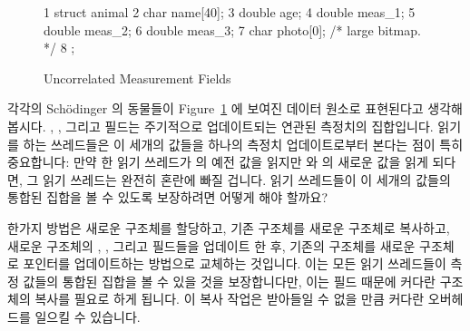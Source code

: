 \begin{figure}[tbp]
{ \scriptsize
\begin{verbbox}
 1 struct animal {
 2   char name[40];
 3   double age;
 4   double meas_1;
 5   double meas_2;
 6   double meas_3;
 7   char photo[0]; /* large bitmap. */
 8 };
\end{verbbox}
}
\centering
\theverbbox
\caption{Uncorrelated Measurement Fields}
\label{fig:together:Uncorrelated Measurement Fields}
\end{figure}

각각의 Sch\"odinger 의 동물들이
Figure~\ref{fig:together:Uncorrelated Measurement Fields}
에 보여진 데이터 원소로 표현된다고 생각해 봅시다.
, , 그리고  필드는 주기적으로 업데이트되는
연관된 측정치의 집합입니다.
읽기를 하는 쓰레드들은 이 세개의 값들을 하나의 측정치 업데이트로부터 본다는
점이 특히 중요합니다: 만약 한 읽기 쓰레드가  의 예전 값을 읽지만
 와  의 새로운 값을 읽게 되다면, 그 읽기 쓰레드는 완전히
혼란에 빠질 겁니다.
읽기 쓰레드들이 이 세개의 값들의 통합된 집합을 볼 수 있도록 보장하려면 어떻게
해야 할까요?
\iffalse

Suppose that each of Sch\"odinger's animals is represented by the
data element shown in
Figure~\ref{fig:together:Uncorrelated Measurement Fields}.
The \co{meas_1}, \co{meas_2}, and \co{meas_3} fields are a set
of correlated measurements that are updated periodically.
It is critically important that readers see these three values from
a single measurement update: If a reader sees an old value of
\co{meas_1} but new values of \co{meas_2} and \co{meas_3}, that
reader will become fatally confused.
How can we guarantee that readers will see coordinated sets of these
three values?
\fi

한가지 방법은 새로운  구조체를 할당하고, 기존 구조체를 새로운
구조체로 복사하고, 새로운 구조체의 , , 그리고 
필드들을 업데이트 한 후, 기존의 구조체를 새로운 구조체로 포인터를 업데이트하는
방법으로 교체하는 것입니다.
이는 모든 읽기 쓰레드들이 측정 값들의 통합된 집합을 볼 수 있을 것을
보장합니다만, 이는  필드 때문에 커다란 구조체의 복사를 필요로
하게 됩니다.
이 복사 작업은 받아들일 수 없을 만큼 커다란 오버헤드를 일으킬 수 있습니다.
\iffalse

One approach would be to allocate a new \co{animal} structure,
copy the old structure into the new structure, update the new
structure's \co{meas_1}, \co{meas_2}, and \co{meas_3} fields,
and then replace the old structure with a new one by updating
the pointer.
This does guarantee that all readers see coordinated sets of
measurement values, but it requires copying a large structure due
to the \co{->photo[]} field.
This copying might incur unacceptably large overhead.
\fi

